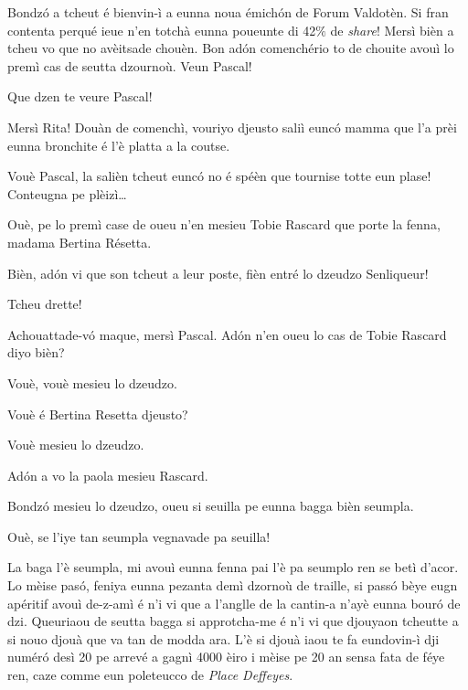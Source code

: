 \begin{drama}

\Ritaspeaks Bondzó a tcheut é bienvin-ì a eunna noua émichón de Forum Valdotèn. Si fran contenta perqué ieue n’en totchà eunna poueunte di 42$\%$ de \textit{share}! Mersì bièn a tcheu vo que no avèi\-tsade chouèn. Bon adón comenchério to de chouite avouì lo premì cas de seutta dzournoù. Veun Pascal!


\Ritaspeaks Que dzen te veure Pascal!

\Pascalspeaks Mersì Rita! Douàn de comenchì, vouriyo djeusto saliì euncó mamma que l’a prèi eunna bronchite é l’è platta a la coutse.

\Ritaspeaks {} Vouè Pascal, la salièn tcheut euncó no é spéèn que tournise totte eun plase! Conteugna pe plèizì\ldots

\Pascalspeaks Ouè, pe lo premì case de oueu n'en mesieu Tobie Rascard que porte la fenna, madama Bertina Résetta.


\Ritaspeaks Bièn, adón vi que son tcheut a leur poste, fièn entré lo dzeudzo Senliqueur!


\Pascalspeaks {} Tcheu drette! 

\DzeudzoSenliquerspeaks {} A\-chou\-at\-ta\-de-v\'o ma\-que, mersì Pascal. Adón n'en oueu lo cas de Tobie Rascard  diyo bièn?

\Tobiespeaks Vouè, vouè mesieu lo dzeudzo.

\DzeudzoSenliquerspeaks Vouè é Bertina Resetta djeusto?

\Bertinaspeaks Vouè mesieu lo dzeudzo.

\DzeudzoSenliquerspeaks Adón a vo la paola mesieu Rascard.

\Tobiespeaks Bondzó mesieu lo dzeudzo, oueu si seuilla pe eunna bagga bièn seumpla.

\DzeudzoSenliquerspeaks Ouè, se l'iye tan seumpla vegnavade pa seuilla!

\Tobiespeaks La baga l'è seumpla, mi avouì eunna fenna pai l'è pa seumplo ren se betì d'acor. Lo mèise pas\'o, feniya eunna pezanta demì dzornoù de traille, si passó bèye eugn apéritif avouì de-z-amì é n’i vi que a l’anglle de la cantin-a n’ayè eunna bour\'o de dzi. Queuriaou de seutta bagga si approtcha-me é n’i vi que djouyaon tcheutte a si nouo djouà que va tan de modda ara. L’è si djouà iaou te fa eundovin-ì dji numéró desì 20 pe arrevé a gagnì 4000 èiro i mèise pe 20 an sensa fata de féye ren, caze comme eun poleteucco de \textit{Place Deffeyes}.


\end{drama}
